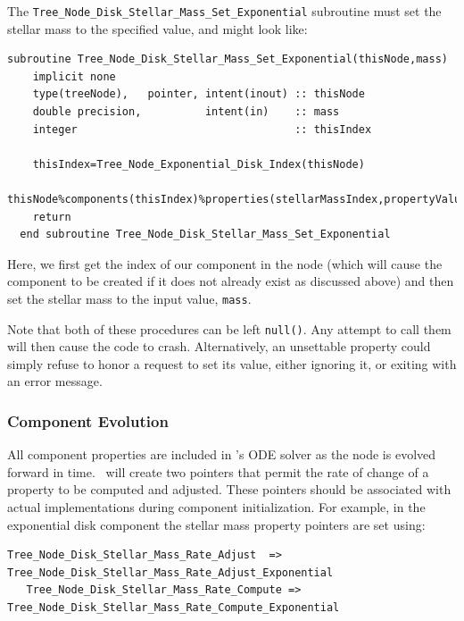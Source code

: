 The {\tt Tree\_Node\_Disk\_Stellar\_Mass\_Set\_Exponential} subroutine must set the stellar mass to the specified value, and might look like:
\begin{lstlisting}[escapechar=@,breaklines,prebreak=\&,postbreak=\&]
  subroutine Tree_Node_Disk_Stellar_Mass_Set_Exponential(thisNode,mass)
    implicit none
    type(treeNode),   pointer, intent(inout) :: thisNode
    double precision,          intent(in)    :: mass
    integer                                  :: thisIndex

    thisIndex=Tree_Node_Exponential_Disk_Index(thisNode)
    thisNode%components(thisIndex)%properties(stellarMassIndex,propertyValue)=mass
    return
  end subroutine Tree_Node_Disk_Stellar_Mass_Set_Exponential
\end{lstlisting}
Here, we first get the index of our component in the node (which will cause the component to be created if it does not already exist as discussed above) and then set the stellar mass to the input value, {\tt mass}.

Note that both of these procedures can be left {\tt null()}. Any attempt to call them will then cause the code to crash. Alternatively, an unsettable property could simply refuse to honor a request to set its value, either ignoring it, or exiting with an error message.

\subsubsection{Component Evolution}\label{sec:ComponentEvolution}

All component properties are included in \glc's ODE solver as the node is evolved forward in time. \glc\ will create two pointers that permit the rate of change of a property to be computed and adjusted. These pointers should be associated with actual implementations during component initialization. For example, in the exponential disk component the stellar mass property pointers are set using:
\begin{lstlisting}[escapechar=@,breaklines,prebreak=\&,postbreak=\&]
   Tree_Node_Disk_Stellar_Mass_Rate_Adjust  => Tree_Node_Disk_Stellar_Mass_Rate_Adjust_Exponential
   Tree_Node_Disk_Stellar_Mass_Rate_Compute => Tree_Node_Disk_Stellar_Mass_Rate_Compute_Exponential
\end{lstlisting}

